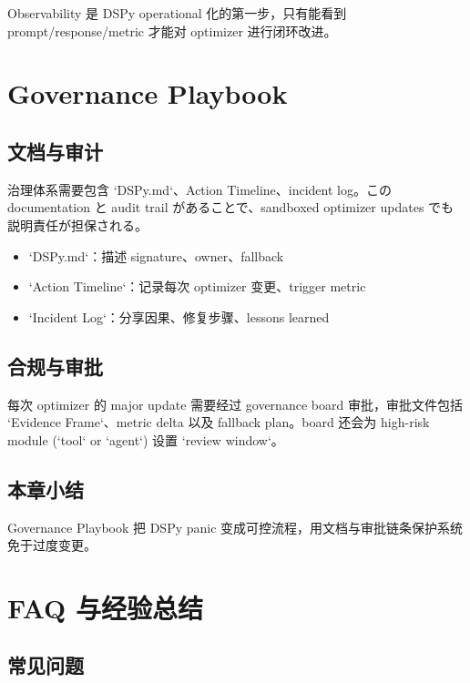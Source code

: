 \documentclass[a4paper]{article}
\begin{document}
Observability 是 DSPy operational 化的第一步，只有能看到 prompt/response/metric 才能对 optimizer 进行闭环改进。

\section{Governance Playbook}

\subsection{文档与审计}

治理体系需要包含 `DSPy.md`、Action Timeline、incident log。この documentation と audit trail があることで、sandboxed optimizer updates でも説明責任が担保される。

\begin{itemize}
    \item `DSPy.md`：描述 signature、owner、fallback
    \item `Action Timeline`：记录每次 optimizer 变更、trigger metric
    \item `Incident Log`：分享因果、修复步骤、lessons learned
\end{itemize}

\subsection{合规与审批}

每次 optimizer 的 major update 需要经过 governance board 审批，审批文件包括 `Evidence Frame`、metric delta 以及 fallback plan。board 还会为 high-risk module (`tool` or `agent`) 设置 `review window`。

\subsection{本章小结}

Governance Playbook 把 DSPy panic 变成可控流程，用文档与审批链条保护系统免于过度变更。

\section{FAQ 与经验总结}

\subsection{常见问题}
\end{document}
